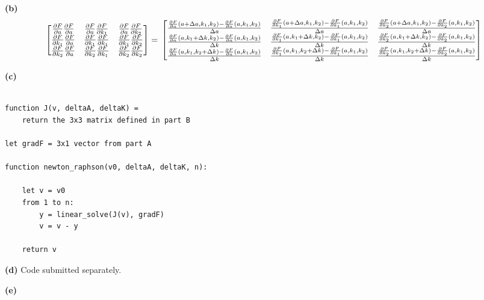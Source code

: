 \documentclass[11pt,letterpaper]{article}
\renewcommand{\part}[1] {\vspace{.10in} {\bf (#1)}}
\begin{document}
\part{b}
\newcommand{\dubpartial}[2]{\frac{\partial F}{\partial #1} \frac{\partial F}{\partial #2}}
\newcommand{\partiala}[1]{\frac{\frac{\partial F}{\partial #1}(a + \Delta a, k_1, k_2) - \frac{\partial F}{\partial #1}(a, k_1, k_2)}{\Delta a}}
\newcommand{\partialone}[1]{\frac{\frac{\partial F}{\partial #1}(a, k_1 + \Delta k, k_2) - \frac{\partial F}{\partial #1}(a, k_1, k_2)}{\Delta k}}
\newcommand{\partialtwo}[1]{\frac{\frac{\partial F}{\partial #1}(a, k_1, k_2 + \Delta k) - \frac{\partial F}{\partial #1}(a, k_1, k_2)}{\Delta k}}
$$
 \begin{bmatrix}
   \dubpartial{a}{a} & \dubpartial{a}{k_1} & \dubpartial{a}{k_2} \\
   \dubpartial{k_1}{a} & \dubpartial{k_1}{k_1} & \dubpartial{k_1}{k_2} \\
   \dubpartial{k_2}{a} & \dubpartial{k_2}{k_1} & \dubpartial{k_2}{k_2}
 \end{bmatrix}
 = \\
 \begin{bmatrix}
   \partiala{a} & \partiala{k_1} & \partiala{k_2} \\
   \partialone{a} & \partialone{k_1} & \partialone{k_2} \\
   \partialtwo{a} & \partialtwo{k_1} & \partialtwo{k_2}
 \end{bmatrix}
 $$

\part{c}
\begin{verbatim}

function J(v, deltaA, deltaK) =
    return the 3x3 matrix defined in part B

let gradF = 3x1 vector from part A

function newton_raphson(v0, deltaA, deltaK, n):

    let v = v0
    from 1 to n:
        y = linear_solve(J(v), gradF)
        v = v - y

    return v
\end{verbatim}

\part{d}
Code submitted separately.

\part{e}
\end{document}
